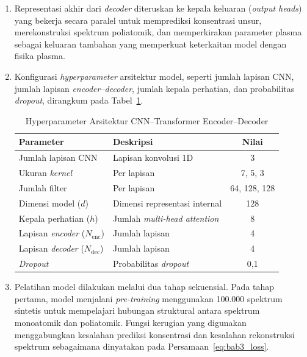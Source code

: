 \begin{enumerate}
    \item Representasi akhir dari \textit{decoder} diteruskan ke kepala keluaran (\textit{output heads}) yang bekerja secara paralel untuk memprediksi konsentrasi unsur, merekonstruksi spektrum poliatomik, dan memperkirakan parameter plasma sebagai keluaran tambahan yang memperkuat keterkaitan model dengan fisika plasma.

    \item Konfigurasi \textit{hyperparameter} arsitektur model, seperti jumlah lapisan CNN, jumlah lapisan \textit{encoder--decoder}, jumlah kepala perhatian, dan probabilitas \textit{dropout}, dirangkum pada Tabel~\ref{tab:hyperparameter_model}.

  \begin{table}[H]
  \centering
  \caption{Hyperparameter Arsitektur CNN--Transformer Encoder--Decoder}
  \label{tab:hyperparameter_model}
  \small
  \begin{tabular}{|l|l|c|}
    \hline
    \textbf{Parameter} & \textbf{Deskripsi} & \textbf{Nilai} \\
    \hline
    Jumlah lapisan CNN & Lapisan konvolusi 1D & 3 \\
    \hline
    Ukuran \textit{kernel} & Per lapisan & 7, 5, 3 \\
    \hline
    Jumlah filter & Per lapisan & 64, 128, 128 \\
    \hline
    Dimensi model ($d$) & Dimensi representasi internal & 128 \\
    \hline
    Kepala perhatian ($h$) & Jumlah \textit{multi-head attention} & 8 \\
    \hline
    Lapisan \textit{encoder} ($N_{\mathrm{enc}}$) & Jumlah lapisan & 4 \\
    \hline
    Lapisan \textit{decoder} ($N_{\mathrm{dec}}$) & Jumlah lapisan & 4 \\
    \hline
    \textit{Dropout} & Probabilitas \textit{dropout} & 0,1 \\
    \hline
  \end{tabular}
\end{table}
    \item Pelatihan model dilakukan melalui dua tahap sekuensial. Pada tahap pertama, model menjalani \textit{pre-training} menggunakan 100.000 spektrum sintetis untuk mempelajari hubungan struktural antara spektrum monoatomik dan poliatomik. Fungsi kerugian yang digunakan menggabungkan kesalahan prediksi konsentrasi dan kesalahan rekonstruksi spektrum sebagaimana dinyatakan pada Persamaan~\ref{eq:bab3_loss}.


\end{enumerate}
